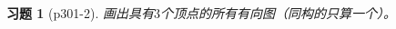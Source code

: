 \documentclass{article}
\begin{document}
\begin{CJK}{UTF8}{gbsn}
  \newtheorem*{Exercise}{习题}
  \huge
\begin{Exercise}[p301-2]
  画出具有$3$个顶点的所有有向图（同构的只算一个）。
\end{Exercise}

\end{CJK}
\end{document}
